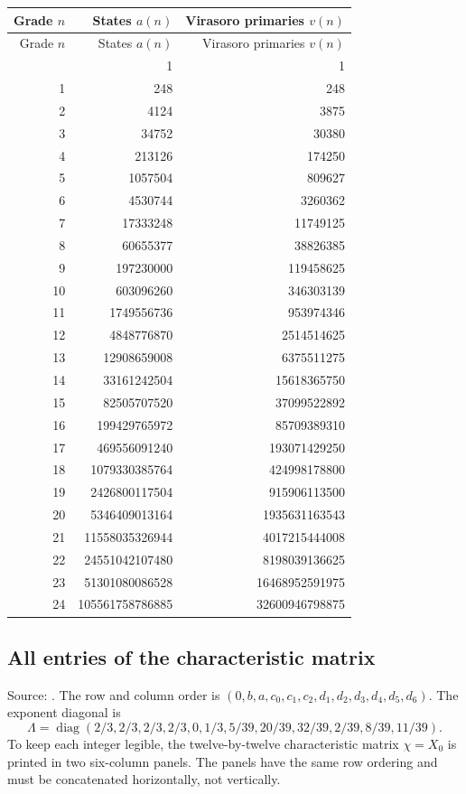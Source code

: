 \begingroup\small
\setlength{\tabcolsep}{5pt}
\begin{longtable}{@{}rrr@{}}
\toprule
Grade $n$ & States $a(n)$ & Virasoro primaries $v(n)$\\
\midrule\endfirsthead
\toprule
Grade $n$ & States $a(n)$ & Virasoro primaries $v(n)$\\
\midrule\endhead
\bottomrule\endfoot
0 & 1 & 1\\
1 & 248 & 248\\
2 & 4124 & 3875\\
3 & 34752 & 30380\\
4 & 213126 & 174250\\
5 & 1057504 & 809627\\
6 & 4530744 & 3260362\\
7 & 17333248 & 11749125\\
8 & 60655377 & 38826385\\
9 & 197230000 & 119458625\\
10 & 603096260 & 346303139\\
11 & 1749556736 & 953974346\\
12 & 4848776870 & 2514514625\\
13 & 12908659008 & 6375511275\\
14 & 33161242504 & 15618365750\\
15 & 82505707520 & 37099522892\\
16 & 199429765972 & 85709389310\\
17 & 469556091240 & 193071429250\\
18 & 1079330385764 & 424998178800\\
19 & 2426800117504 & 915906113500\\
20 & 5346409013164 & 1935631163543\\
21 & 11558035326944 & 4017215444008\\
22 & 24551042107480 & 8198039136625\\
23 & 51301080086528 & 16468952591975\\
24 & 105561758786885 & 32600946798875\\
\end{longtable}
\endgroup
\subsection{All entries of the characteristic matrix}
\label{expdata:recurrence}
Source: .
The row and column order is $(0,b,a,c_0,c_1,c_2,d_1,d_2,d_3,d_4,d_5,d_6)$.
The exponent diagonal is
\[
\Lambda=\operatorname{diag}(2/3,2/3,2/3,2/3,0,1/3,5/39,20/39,32/39,2/39,8/39,11/39 ).
\]
To keep each integer legible, the twelve-by-twelve characteristic matrix
$\chi=X_0$ is printed in two six-column panels. The panels have the same
row ordering and must be concatenated horizontally, not vertically.

